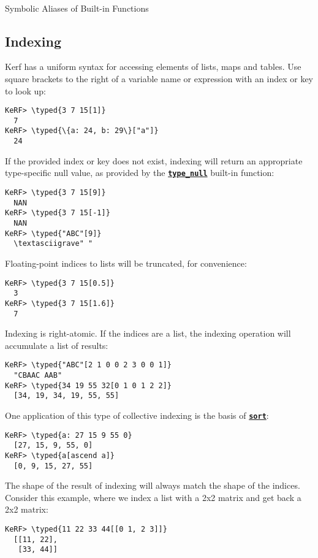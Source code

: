 \documentclass{article}
\newcommand{\typed}[1]{\textcolor{TealBlue}{#1}}
\newcommand{\primu}[2]{\hyperref[prim:#2]{\textbf{\texttt{#1}}}}
\newcommand{\prim}[1]{\primu{#1}{#1}}
\begin{document}
\begin{table}[h]
\begin{tabular}{| c | l | l |}
		\hline
	\end{tabular}
	\\ \bigskip Symbolic Aliases of Built-in Functions
\end{table}

\pagebreak
\subsection{Indexing}
Kerf has a uniform syntax for accessing elements of lists, maps and tables. Use square brackets to the right of a variable name or expression with an index or key to look up:
\begin{Verbatim}
KeRF> \typed{3 7 15[1]}
  7
KeRF> \typed{\{a: 24, b: 29\}["a"]}
  24
\end{Verbatim}

If the provided index or key does not exist, indexing will return an appropriate type-specific null value, as provided by the \primu{type\_null}{typeNull} built-in function:
\begin{Verbatim}
KeRF> \typed{3 7 15[9]}
  NAN
KeRF> \typed{3 7 15[-1]}
  NAN
KeRF> \typed{"ABC"[9]}
  \textasciigrave" "
\end{Verbatim}

Floating-point indices to lists will be truncated, for convenience:
\begin{Verbatim}
KeRF> \typed{3 7 15[0.5]}
  3
KeRF> \typed{3 7 15[1.6]}
  7
\end{Verbatim}

Indexing is right-atomic. If the indices are a list, the indexing operation will accumulate a list of results:
\begin{Verbatim}
KeRF> \typed{"ABC"[2 1 0 0 2 3 0 0 1]}
  "CBAAC AAB"
KeRF> \typed{34 19 55 32[0 1 0 1 2 2]}
  [34, 19, 34, 19, 55, 55]
\end{Verbatim}

One application of this type of collective indexing is the basis of \prim{sort}:
\begin{Verbatim}
KeRF> \typed{a: 27 15 9 55 0}
  [27, 15, 9, 55, 0]
KeRF> \typed{a[ascend a]}
  [0, 9, 15, 27, 55]
\end{Verbatim}

The shape of the result of indexing will always match the shape of the indices. Consider this example, where we index a list with a 2x2 matrix and get back a 2x2 matrix:
\begin{Verbatim}
KeRF> \typed{11 22 33 44[[0 1, 2 3]]}
  [[11, 22], 
   [33, 44]]
\end{Verbatim}
\end{document}
